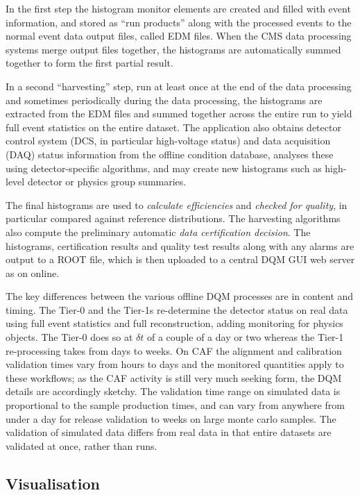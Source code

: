 \documentclass[a4paper]{jpconf}
\begin{document}
In the first step the histogram monitor elements are created and filled with
event information, and stored as ``run products'' along with the processed
events to the normal event data output files, called EDM files.  When the CMS
data processing systems merge output files together, the histograms are
automatically summed together to form the first partial result.

In a second ``harvesting'' step, run at least once at the end of the data
processing and sometimes periodically during the data processing, the
histograms are extracted from the EDM files and summed together across the
entire run to yield full event statistics on the entire dataset.  The
application also obtains detector control system (DCS, in particular
high-voltage status) and data acquisition (DAQ) status information from the
offline condition database, analyses these using detector-specific algorithms,
and may create new histograms such as high-level detector or physics group
summaries.

The final histograms are used to {\em calculate efficiencies} and {\em checked
  for quality}, in particular compared against reference distributions.  The
harvesting algorithms also compute the preliminary automatic {\em data
  certification decision}.  The histograms, certification results and quality
test results along with any alarms are output to a ROOT file, which is then
uploaded to a central DQM GUI web server as on online.

The key differences between the various offline DQM processes are in content
and timing.  The Tier-0 and the Tier-1s re-determine the detector status on
real data using full event statistics and full reconstruction, adding
monitoring for physics objects.  The Tier-0 does so at $\delta t$ of a couple
of a day or two whereas the Tier-1 re-processing takes from days to weeks.  On
CAF the alignment and calibration validation times vary from hours to days and
the monitored quantities apply to these workflows; as the CAF activity is
still very much seeking form, the DQM details are accordingly sketchy.  The
validation time range on simulated data is proportional to the sample
production times, and can vary from anywhere from under a day for release
validation to weeks on large monte carlo samples.  The validation of simulated
data differs from real data in that entire datasets are validated at once,
rather than runs.

\subsection{Visualisation}
\end{document}
